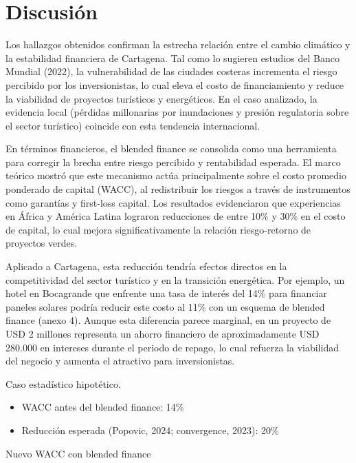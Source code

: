 \section{Discusión}

Los hallazgos obtenidos confirman la estrecha relación entre el cambio climático y la estabilidad financiera de Cartagena. Tal como lo sugieren estudios del Banco Mundial (2022), la vulnerabilidad de las ciudades costeras incrementa el riesgo percibido por los inversionistas, lo cual eleva el costo de financiamiento y reduce la viabilidad de proyectos turísticos y energéticos. En el caso analizado, la evidencia local (pérdidas millonarias por inundaciones y presión regulatoria sobre el sector turístico) coincide con esta tendencia internacional.

En términos financieros, el blended finance se consolida como una herramienta para corregir la brecha entre riesgo percibido y rentabilidad esperada. El marco teórico mostró que este mecanismo actúa principalmente sobre el costo promedio ponderado de capital (WACC), al redistribuir los riesgos a través de instrumentos como garantías y first-loss capital. Los resultados evidenciaron que experiencias en África y América Latina lograron reducciones de entre 10\% y 30\% en el costo de capital, lo cual mejora significativamente la relación riesgo-retorno de proyectos verdes.

Aplicado a Cartagena, esta reducción tendría efectos directos en la competitividad del sector turístico y en la transición energética. Por ejemplo, un hotel en Bocagrande que enfrente una tasa de interés del 14\% para financiar paneles solares podría reducir este costo al 11\% con un esquema de blended finance (anexo 4). Aunque esta diferencia parece marginal, en un proyecto de USD 2 millones representa un ahorro financiero de aproximadamente USD 280.000 en intereses durante el periodo de repago, lo cual refuerza la viabilidad del negocio y aumenta el atractivo para inversionistas. %

\noindent Caso estadístico hipotético.

\begin{itemize}
    \item WACC antes del blended finance: 14\%
    
    \item Reducción esperada (Popovic, 2024; convergence, 2023): 20\%
\end{itemize}

\noindent Nuevo WACC con blended finance

